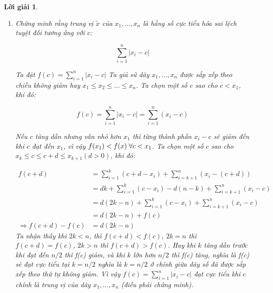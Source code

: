 \documentclass[14pt, a4paper]{article}
\theoremstyle{sltheorem}
\theoremstyle{soltheorem}
\newtheorem*{loigiai}{Lời giải}
\begin{document}
\begin{loigiai}
\begin{enumerate}[wide, labelwidth=!, labelindent=0pt,label=\textbf{\arabic*}.]
        \item Chứng minh rằng trung vị $\tilde{x}$ của $x_1, \dots, x_n$ là hằng số cực tiểu hóa sai lệch tuyệt đối tương ứng với $c$:

        \begin{equation*}
            \sum_{i=1}^n \lvert x_i - c \vert
        \end{equation*}

        Ta đặt $f(c) = \sum_{i=1}^n \lvert x_i - c \vert$
        Ta giả sử dãy $x_1, \dots, x_n$ được sắp xếp theo chiều không giảm hay $x_1 \leq x_2 \leq \dots \leq x_n$.
        Ta chọn một số $c$ sao cho $c < x_1$, khi đó:

        \begin{equation*}
            f(c) = \sum_{i=1}^n \lvert x_i - c \vert = \sum_{i=1}^n (x_i - c)
        \end{equation*}

        Nếu $c$ tăng dần nhưng vẫn nhỏ hơn $x_1$ thì từng thành phần $x_i - c$ sẽ giảm đến khi $c$ đạt đến $x_1$,
        vì vậy $f(x_1) < f(x) \thickspace \forall c < x_1$.
        Ta chọn một số $c$ sao cho $x_k \leq c \leq c + d \leq x_{k+1}(d > 0)$, khi đó:

        \begin{equation*}
            \begin{aligned}
                f(c + d) &= \sum_{i=1}^k (c + d - x_i) + \sum_{i=k+1}^n (x_i - (c + d)) \\
                &= dk + \sum_{i=1}^k (c - x_i) - d(n-k) + \sum_{i=k+1}^n (x_i - c) \\
                &= d(2k -n) + \sum_{i=1}^k (c - x_i) + \sum_{i=k+1}^n (x_i - c) \\
                &= d(2k - n) + f(c) \\
            \Rightarrow f(c + d) - f(c) &= d(2k - n)
            \end{aligned}
        \end{equation*}
        Ta nhận thấy khi $2k < n$, thì $f(c + d) < f(c)$, $2k = n$ thì $f(c+d)=f(c)$, $2k > n$ thì $f(c+d) > f(c)$.
        Hay khi $k$ tăng dần trước khi đạt đến $n/2$ thì f(c) giảm, và khi $k$ lớn hơn $n / 2$ thì f(c) tăng, nghĩa là f(c) sẽ đạt cực tiểu tại $k=n/2$ nghĩa là $k=n/2$ ở chính giữa dãy số đã được sắp xếp theo thứ tự không giảm.
        Vì vậy $f(c) = \sum_{i=1}^n \lvert x_i - c \vert$ đạt cực tiểu khi $c$ chính là trung vị của dãy $x_1, \dots, x_n$ (điều phải chứng minh).
    \end{enumerate}
\end{loigiai}

\newpage
\printbibliography[title={TÀI LIỆU THAM KHẢO}]
\end{document}
